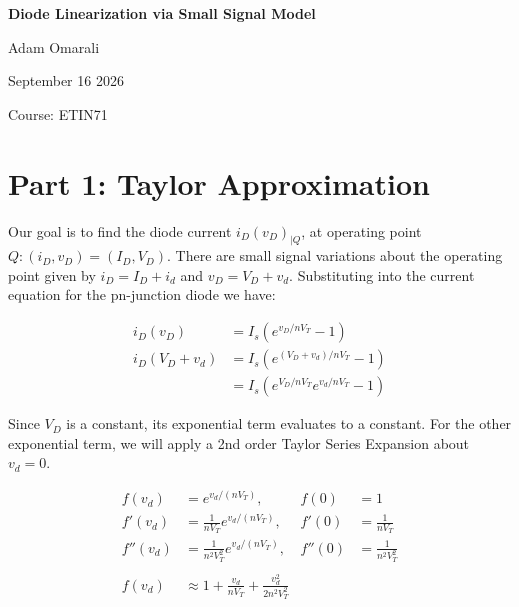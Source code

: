 \documentclass[12pt]{article}
\begin{document}
\hypersetup{pageanchor=false}
\begin{titlepage}
    \thispagestyle{empty}
    \centering
    \vspace*{\fill}
    {\LARGE\bfseries Diode Linearization via Small Signal Model\par}
    \vspace{1.5cm}
    {\large Adam Omarali\par}
    \vspace{0.75cm}
    {\large September 16 2026\par}
    \vspace{0.25cm}
    {\large Course: ETIN71\par}
    \vspace*{\fill}
\end{titlepage}

\setcounter{page}{1}
\hypersetup{pageanchor=true}

\section{Part 1: Taylor Approximation}

Our goal is to find the diode current $i_D(v_D)_{|Q}$, at operating point $Q: (i_D, v_D) = (I_D, V_D)$. 
There are small signal variations about the operating point given by $i_D = I_D + i_d$ and $v_D = V_D + v_d$.
Substituting into the current equation for the pn-junction diode we have:

{
    \begin{align*}
        i_D(v_D)
            &= I_s\left(e^{v_D/nV_T} - 1\right) \\
        i_D(V_D + v_d)
            &= I_s\left(e^{(V_D + v_d)/nV_T} - 1\right) \\
            &= I_s\left(e^{V_D/nV_T}e^{v_d/nV_T} - 1\right)
    \end{align*}
}

Since $V_D$ is a constant, its exponential term evaluates to a constant. For the other exponential term, we will apply a 2nd order Taylor Series Expansion about $v_d = 0$.

\[
\begin{aligned}
f(v_d) &= e^{v_d/(nV_T)},
& f(0) &= 1 \\
f'(v_d) &= \frac{1}{nV_T}e^{v_d/(nV_T)},
& f'(0) &= \frac{1}{nV_T} \\
f''(v_d) &= \frac{1}{n^2V_T^2}e^{v_d/(nV_T)},
& f''(0) &= \frac{1}{n^2V_T^2} \\ \\ 
f(v_d) &\approx 1 + \frac{v_d}{nV_T} + \frac{v_d^2}{2n^2V_T^2}
\end{aligned}
\]
\end{document}
